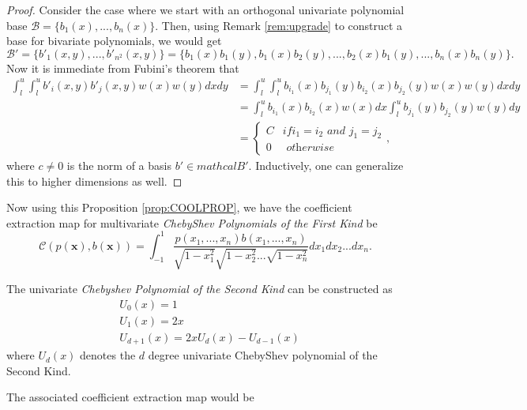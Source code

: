 \documentclass[12pt]{amsart}
\numberwithin{equation}{section}
\theoremstyle{definition}
\numberwithin{thm}{section}
\begin{document}
\begin{proof}
     Consider the case where we start with an orthogonal univariate polynomial base $\mathcal{B} = \{b_1(x), ..., b_n(x)\}$. 
     Then, using Remark \ref{rem:upgrade} to construct a base for bivariate polynomials, we would get 
     \begin{equation*}
          \mathcal{B}' =  \{b'_1(x, y), ..., b'_{n^2}(x, y)\} = \{b_1(x)b_1(y), b_1(x)b_2(y), ..., b_2(x)b_1(y), ..., b_n(x)b_n(y)\}.
     \end{equation*}
     Now it is immediate from Fubini's theorem that
     \begin{align*}
          \int_l^u \int_l^u  b'_i(x, y)b'_j(x, y)w(x)w(y) dx dy  & = \int_l^u \int_l^u  b_{i_1}(x) b_{j_1}(y) b_{i_2}(x)b_{j_2}(y) w(x)w(y) dx dy \\
               & = \int_l^u  b_{i_1}(x) b_{i_2}(x) w(x) dx  \int_l^u b_{j_1}(y) b_{j_2}(y) w(y) dy \\
               & = \begin{cases}
                    C & if i_1 = i_2 \textit{ and } j_1 = j_2\\
                    0 & \textit{ otherwise }
              \end{cases},
     \end{align*}
     where $c \neq 0$ is the norm of a basis $b' \in mathcal{B}'$.
     Inductively, one can generalize this to higher dimensions as well.
\end{proof}

Now using this Proposition \ref{prop:COOLPROP}, we have the {coefficient extraction map} for multivariate \emph{ChebyShev Polynomials of the First Kind} be
\begin{equation*}
     \mathcal{C}(p(\mathbf{x}), b(\mathbf{x})) = \int_{-1}^1 \frac{p(x_1, ..., x_n)b(x_1, ..., x_n)}{\sqrt{1-x_1^2} \sqrt{1-x_2^2} ... \sqrt{1-x_n^2}} dx_1dx_2 ... dx_n.
\end{equation*} 

The univariate \emph{Chebyshev Polynomial of the Second Kind} can be constructed as
\begin{align*} 
     &U_0(x) = 1 \\ 
     &U_1(x) = 2x \\
     &U_{d+1}(x) = 2x U_d(x) - U_{d-1}(x)
\end{align*}
where $U_d(x)$ denotes the $d$ degree univariate ChebyShev polynomial of the Second Kind.

The associated {coefficient extraction map} would be
\end{document}
